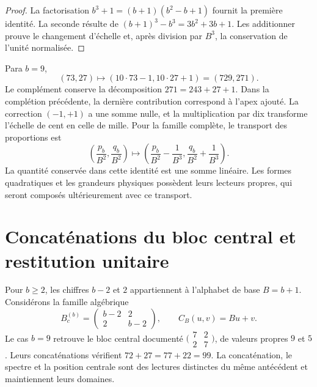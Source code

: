 \begin{proof}
La factorisation \(b^3+1=(b+1)(b^2-b+1)\) fournit la première
identité. La seconde résulte de
\((b+1)^3-b^3=3b^2+3b+1\). Les additionner prouve le changement d’échelle et,
après division par \(B^3\), la conservation de l’unité normalisée.
\end{proof}

Para \(b=9\),
\begin{equation}
 (73,27)\longmapsto(10\cdot73-1,10\cdot27+1)=(729,271).
 \label{x_reciprocidad:lib03:caso-729}
\end{equation}
Le complément conserve la décomposition \(271=243+27+1\). Dans la complétion précédente, la dernière contribution correspond à l'apex ajouté. La correction \((-1,+1)\) a une somme nulle, et la multiplication par dix transforme l'échelle de cent en celle de mille. Pour la famille complète, le transport des proportions est
\begin{equation}
 \left(\frac{p_b}{B^2},\frac{q_b}{B^2}\right)
 \longmapsto
 \left(\frac{p_b}{B^2}-\frac1{B^3},
       \frac{q_b}{B^2}+\frac1{B^3}\right).
 \label{x_reciprocidad:lib03:fracciones-completacion}
\end{equation}
La quantité conservée dans cette identité est une somme linéaire. Les formes
quadratiques et les grandeurs physiques possèdent leurs lecteurs propres, qui
seront composés ultérieurement avec ce transport.

\section{Concaténations du bloc central et restitution unitaire}
\label{x_reciprocidad:lib03:centro}

Pour \(b\geq2\), les chiffres \(b-2\) et \(2\) appartiennent à l’alphabet de
base \(B=b+1\). Considérons la famille algébrique
\begin{equation}
 B_c^{(b)}=\begin{pmatrix}b-2&2\\2&b-2\end{pmatrix},\qquad
 C_B(u,v)=Bu+v.
 \label{x_reciprocidad:lib03:bloque-central}
\end{equation}
Le cas \(b=9\) retrouve le bloc central documenté
\(\bigl(\begin{smallmatrix}7&2\\2&7\end{smallmatrix}\bigr)\), de
valeurs propres \(9\) et \(5\). Leurs concaténations vérifient
\(72+27=77+22=99\). La concaténation, le spectre et la position centrale sont des
lectures distinctes du même antécédent et maintiennent leurs domaines.

